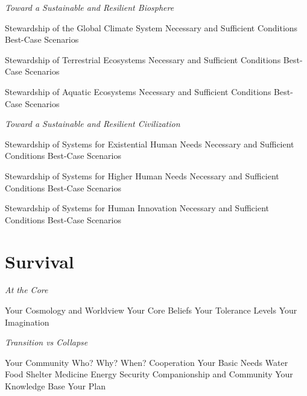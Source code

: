 \documentclass[12pt, letterpaper]{article}
\begin{document}
\large
\begin{flushleft}
\textit{Toward a Sustainable and Resilient Biosphere}
\end{flushleft}

\normalsize

\begin{outline}[enumerate]
\1 Stewardship of the Global Climate System
\2 Necessary and Sufficient Conditions
\2 Best-Case Scenarios

\1 Stewardship of Terrestrial Ecosystems
\2 Necessary and Sufficient Conditions
\2 Best-Case Scenarios

\1 Stewardship of Aquatic Ecosystems
\2 Necessary and Sufficient Conditions
\2 Best-Case Scenarios
\end{outline}

\large
\begin{flushleft}
\textit{Toward a Sustainable and Resilient Civilization}
\end{flushleft}

\normalsize

\begin{outline}[enumerate]
\1 Stewardship of Systems for Existential Human Needs
\2 Necessary and Sufficient Conditions
\2 Best-Case Scenarios

\1 Stewardship of Systems for Higher Human Needs
\2 Necessary and Sufficient Conditions
\2 Best-Case Scenarios

\1 Stewardship of Systems for Human Innovation
\2 Necessary and Sufficient Conditions
\2 Best-Case Scenarios
\end{outline}


\section{Survival}

\large
\begin{flushleft}
\textit{At the Core}
\end{flushleft}

\normalsize
\begin{outline}[enumerate]
\1 Your Cosmology and Worldview
\2 Your Core Beliefs
\2 Your Tolerance Levels
\2 Your Imagination
\end{outline}

\large
\begin{flushleft}
\textit{Transition vs Collapse}
\end{flushleft}

\normalsize
\begin{outline}[enumerate]
\1 Your Community
\2 Who? 
\2 Why?
\2 When?
\2 Cooperation
\1 Your Basic Needs
\2 Water
\2 Food
\2 Shelter
\2 Medicine
\2 Energy
\2 Security
\2 Companionship and Community
\1 Your Knowledge Base
\1 Your Plan


\end{outline}





\clearpage 
\renewcommand{\thepage}{}
\printbibliography
\end{document}
